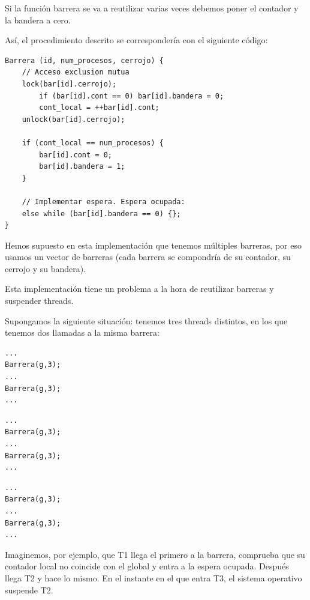 \documentclass[10pt,a4paper,spanish]{report}
\begin{document}
Si la función barrera se va a reutilizar varias veces debemos poner el contador y la bandera a cero.

Así, el procedimiento descrito se correspondería con el siguiente código:

\begin{verbatim}
Barrera (id, num_procesos, cerrojo) {
    // Acceso exclusion mutua
    lock(bar[id].cerrojo);
        if (bar[id].cont == 0) bar[id].bandera = 0;
        cont_local = ++bar[id].cont;
    unlock(bar[id].cerrojo);

    if (cont_local == num_procesos) {
        bar[id].cont = 0;
        bar[id].bandera = 1;
    }

    // Implementar espera. Espera ocupada:
    else while (bar[id].bandera == 0) {};
}
\end{verbatim}

Hemos supuesto en esta implementación que tenemos múltiples barreras, por eso usamos un vector de barreras (cada barrera se compondría de su contador, su cerrojo y su bandera).

Esta implementación tiene un problema a la hora de reutilizar barreras y suspender threads.

Supongamos la siguiente situación: tenemos tres threads distintos, en los que tenemos dos llamadas a la misma barrera:

\begin{center}
\begin{minipage}{0.3\textwidth}
\begin{verbatim}
...
Barrera(g,3);
...
Barrera(g,3);
...
\end{verbatim}
\end{minipage}
\begin{minipage}{0.3\textwidth}
\begin{verbatim}
...
Barrera(g,3);
...
Barrera(g,3);
...
\end{verbatim}
\end{minipage}
\begin{minipage}{0.3\textwidth}
\begin{verbatim}
...
Barrera(g,3);
...
Barrera(g,3);
...
\end{verbatim}
\end{minipage}
\end{center}

Imaginemos, por ejemplo, que T1 llega el primero a la barrera, comprueba que su contador local no coincide con el global y entra a la espera ocupada. Después llega T2 y hace lo mismo. En el instante en el que entra T3, el sistema operativo suspende T2. 
\end{document}
